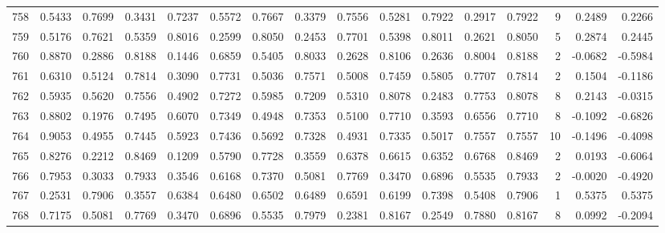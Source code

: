 \begin{tabular}{lrrrrrrrrrrrrrrr}
758 &      0.5433 &  0.7699 &  0.3431 &  0.7237 &  0.5572 &  0.7667 &  0.3379 &  0.7556 &  0.5281 &  0.7922 &   0.2917 &     0.7922 &      9 &                    0.2489 &                     0.2266 \\
759 &      0.5176 &  0.7621 &  0.5359 &  0.8016 &  0.2599 &  0.8050 &  0.2453 &  0.7701 &  0.5398 &  0.8011 &   0.2621 &     0.8050 &      5 &                    0.2874 &                     0.2445 \\
760 &      0.8870 &  0.2886 &  0.8188 &  0.1446 &  0.6859 &  0.5405 &  0.8033 &  0.2628 &  0.8106 &  0.2636 &   0.8004 &     0.8188 &      2 &                   -0.0682 &                    -0.5984 \\
761 &      0.6310 &  0.5124 &  0.7814 &  0.3090 &  0.7731 &  0.5036 &  0.7571 &  0.5008 &  0.7459 &  0.5805 &   0.7707 &     0.7814 &      2 &                    0.1504 &                    -0.1186 \\
762 &      0.5935 &  0.5620 &  0.7556 &  0.4902 &  0.7272 &  0.5985 &  0.7209 &  0.5310 &  0.8078 &  0.2483 &   0.7753 &     0.8078 &      8 &                    0.2143 &                    -0.0315 \\
763 &      0.8802 &  0.1976 &  0.7495 &  0.6070 &  0.7349 &  0.4948 &  0.7353 &  0.5100 &  0.7710 &  0.3593 &   0.6556 &     0.7710 &      8 &                   -0.1092 &                    -0.6826 \\
764 &      0.9053 &  0.4955 &  0.7445 &  0.5923 &  0.7436 &  0.5692 &  0.7328 &  0.4931 &  0.7335 &  0.5017 &   0.7557 &     0.7557 &     10 &                   -0.1496 &                    -0.4098 \\
765 &      0.8276 &  0.2212 &  0.8469 &  0.1209 &  0.5790 &  0.7728 &  0.3559 &  0.6378 &  0.6615 &  0.6352 &   0.6768 &     0.8469 &      2 &                    0.0193 &                    -0.6064 \\
766 &      0.7953 &  0.3033 &  0.7933 &  0.3546 &  0.6168 &  0.7370 &  0.5081 &  0.7769 &  0.3470 &  0.6896 &   0.5535 &     0.7933 &      2 &                   -0.0020 &                    -0.4920 \\
767 &      0.2531 &  0.7906 &  0.3557 &  0.6384 &  0.6480 &  0.6502 &  0.6489 &  0.6591 &  0.6199 &  0.7398 &   0.5408 &     0.7906 &      1 &                    0.5375 &                     0.5375 \\
768 &      0.7175 &  0.5081 &  0.7769 &  0.3470 &  0.6896 &  0.5535 &  0.7979 &  0.2381 &  0.8167 &  0.2549 &   0.7880 &     0.8167 &      8 &                    0.0992 &                    -0.2094 \\

\end{tabular}
